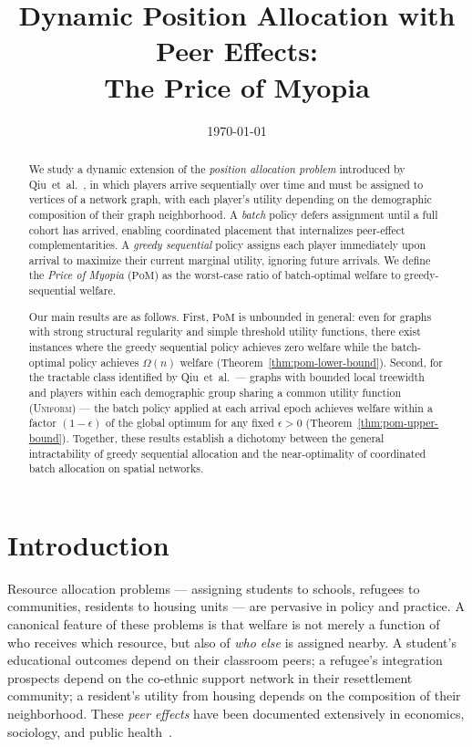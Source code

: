 \documentclass[11pt]{article}
\title{Dynamic Position Allocation with Peer Effects:\\
The Price of Myopia}
\author{}
\date{\today}
\newcommand{\PoM}{\mathrm{PoM}}
\begin{document}
\maketitle

\begin{abstract}
We study a dynamic extension of the \emph{position allocation problem} introduced by
Qiu~et~al.~\cite{qiu2025welfare}, in which players arrive sequentially over time and must
be assigned to vertices of a network graph, with each player's utility depending on the
demographic composition of their graph neighborhood.
A \emph{batch} policy defers assignment until a full cohort has arrived, enabling
coordinated placement that internalizes peer-effect complementarities.
A \emph{greedy sequential} policy assigns each player immediately upon arrival to
maximize their current marginal utility, ignoring future arrivals.
We define the \emph{Price of Myopia} ($\PoM$) as the worst-case ratio of batch-optimal
welfare to greedy-sequential welfare.

Our main results are as follows.
First, $\PoM$ is unbounded in general: even for graphs with strong structural regularity
and simple threshold utility functions, there exist instances where the greedy sequential
policy achieves zero welfare while the batch-optimal policy achieves $\Omega(n)$ welfare
(Theorem~\ref{thm:pom-lower-bound}).
Second, for the tractable class identified by Qiu~et~al.\ --- graphs with bounded local
treewidth and players within each demographic group sharing a common utility function
(\textsc{Uniform}) --- the batch policy applied at each arrival epoch achieves welfare
within a factor $(1-\epsilon)$ of the global optimum for any fixed $\epsilon>0$
(Theorem~\ref{thm:pom-upper-bound}).
Together, these results establish a dichotomy between the general intractability of
greedy sequential allocation and the near-optimality of coordinated batch allocation
on spatial networks.
\end{abstract}

\section{Introduction}

Resource allocation problems --- assigning students to schools, refugees to
communities, residents to housing units --- are pervasive in policy and practice.
A canonical feature of these problems is that welfare is not merely a function of
who receives which resource, but also of \emph{who else} is assigned nearby.
A student's educational outcomes depend on their classroom peers; a refugee's
integration prospects depend on the co-ethnic support network in their resettlement
community; a resident's utility from housing depends on the composition of their
neighborhood.
These \emph{peer effects} have been documented extensively in economics, sociology, and
public health~\cite{schelling1971,chetty2022a,chetty2022b,beaman2012}.
\end{document}
